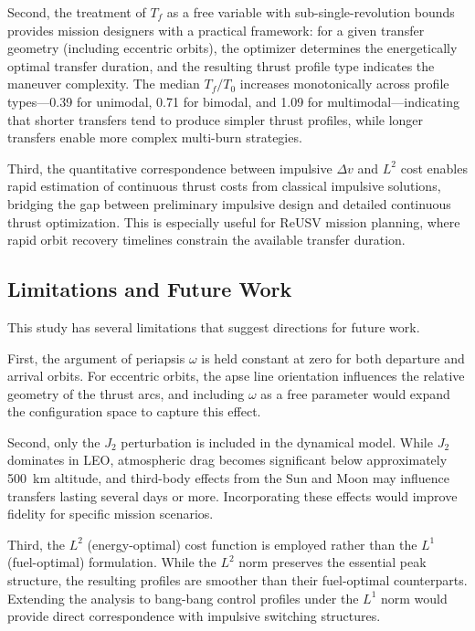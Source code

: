 \documentclass[a4paper,fleqn]{cas-dc}
\let\origsubsection\subsection
\renewcommand{\subsection}{\FloatBarrier\origsubsection}
\begin{document}
Second, the treatment of $T_f$ as a free variable with sub-single-revolution bounds provides mission designers with a practical framework: for a given transfer geometry (including eccentric orbits), the optimizer determines the energetically optimal transfer duration, and the resulting thrust profile type indicates the maneuver complexity. The median $T_f/T_0$ increases monotonically across profile types---0.39 for unimodal, 0.71 for bimodal, and 1.09 for multimodal---indicating that shorter transfers tend to produce simpler thrust profiles, while longer transfers enable more complex multi-burn strategies.

Third, the quantitative correspondence between impulsive $\Delta v$ and $L^2$ cost enables rapid estimation of continuous thrust costs from classical impulsive solutions, bridging the gap between preliminary impulsive design and detailed continuous thrust optimization. This is especially useful for ReUSV mission planning, where rapid orbit recovery timelines constrain the available transfer duration.

\subsection{Limitations and Future Work}\label{subsec:limitations}

This study has several limitations that suggest directions for future work.

First, the argument of periapsis $\omega$ is held constant at zero for both departure and arrival orbits. For eccentric orbits, the apse line orientation influences the relative geometry of the thrust arcs, and including $\omega$ as a free parameter would expand the configuration space to capture this effect.

Second, only the $J_2$ perturbation is included in the dynamical model. While $J_2$ dominates in LEO, atmospheric drag becomes significant below approximately 500~km altitude, and third-body effects from the Sun and Moon may influence transfers lasting several days or more. Incorporating these effects would improve fidelity for specific mission scenarios.

Third, the $L^2$ (energy-optimal) cost function is employed rather than the $L^1$ (fuel-optimal) formulation. While the $L^2$ norm preserves the essential peak structure, the resulting profiles are smoother than their fuel-optimal counterparts. Extending the analysis to bang-bang control profiles under the $L^1$ norm would provide direct correspondence with impulsive switching structures.
\end{document}
